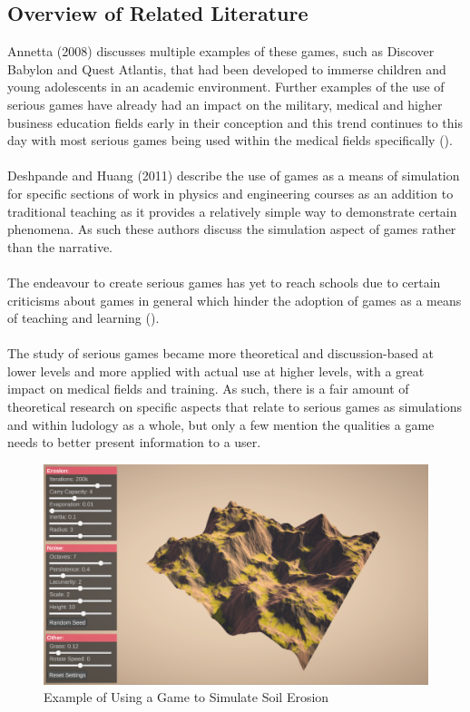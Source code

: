 \subsection{Overview of Related Literature}
Annetta (2008) discusses multiple examples of these games, such as Discover Babylon and Quest Atlantis, that had been developed to immerse children and young adolescents in an academic environment. Further examples of the use of serious games have already had an impact on the military, medical and higher business education fields early in their conception and this trend continues to this day with most serious games being used within the medical fields specifically (\cite{Annetta2008}).
\\\\
Deshpande and Huang (2011) describe the use of games as a means of simulation for specific sections of work in physics and engineering courses as an addition to traditional teaching as it provides a relatively simple way to demonstrate certain phenomena. As such these authors discuss the simulation aspect of games rather than the narrative.
\\\\
The endeavour to create serious games has yet to reach schools due to certain criticisms about games in general which hinder the adoption of games as a means of teaching and learning (\cite{Virvou2005}).
\\\\
The study of serious games became more theoretical and discussion-based at lower levels and more applied with actual use at higher levels, with a great impact on medical fields and training. As such, there is a fair amount of theoretical research on specific aspects that relate to serious games as simulations and within ludology as a whole, but only a few mention the qualities a game needs to better present information to a user. 

\begin{figure}[H]
\centering
\includegraphics[scale=0.4]{Figures/soil}
\caption{Example of Using a Game to Simulate Soil Erosion}
\end{figure}

